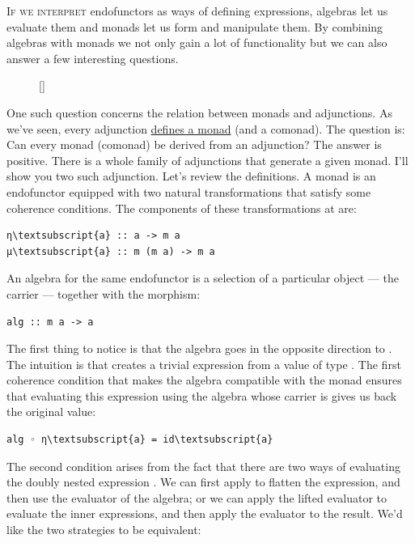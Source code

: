 \lettrine[lhang=0.17]{I}{f we interpret} endofunctors as ways of defining expressions, algebras
let us evaluate them and monads let us form and manipulate them. By
combining algebras with monads we not only gain a lot of functionality
but we can also answer a few interesting questions.
\begin{figure}
\raisebox{0pt}[\dimexpr{}\baselineskip\relax]{
}%
\end{figure}

One such question
concerns the relation between monads and adjunctions. As we've seen,
every adjunction \hyperref[monads-categorically]{defines
a monad} (and a comonad). The question is: Can every monad (comonad) be
derived from an adjunction? The answer is positive. There is a whole
family of adjunctions that generate a given monad. I'll show you two
such adjunction.
Let's review the definitions. A monad is an endofunctor 
equipped with two natural transformations that satisfy some coherence
conditions. The components of these transformations at  are:

\begin{Verbatim}[commandchars=\\\{\}]
η\textsubscript{a} :: a -> m a
μ\textsubscript{a} :: m (m a) -> m a
\end{Verbatim}
An algebra for the same endofunctor is a selection of a particular
object --- the carrier  --- together with the morphism:

\begin{verbatim}
alg :: m a -> a
\end{verbatim}
The first thing to notice is that the algebra goes in the opposite
direction to . The intuition is that  creates a
trivial expression from a value of type . The first coherence
condition that makes the algebra compatible with the monad ensures that
evaluating this expression using the algebra whose carrier is 
gives us back the original value:

\begin{Verbatim}[commandchars=\\\{\}]
alg ◦ η\textsubscript{a} = id\textsubscript{a}
\end{Verbatim}
The second condition arises from the fact that there are two ways of
evaluating the doubly nested expression . We can first
apply  to flatten the expression, and then use the evaluator
of the algebra; or we can apply the lifted evaluator to evaluate the
inner expressions, and then apply the evaluator to the result. We'd like
the two strategies to be equivalent:

